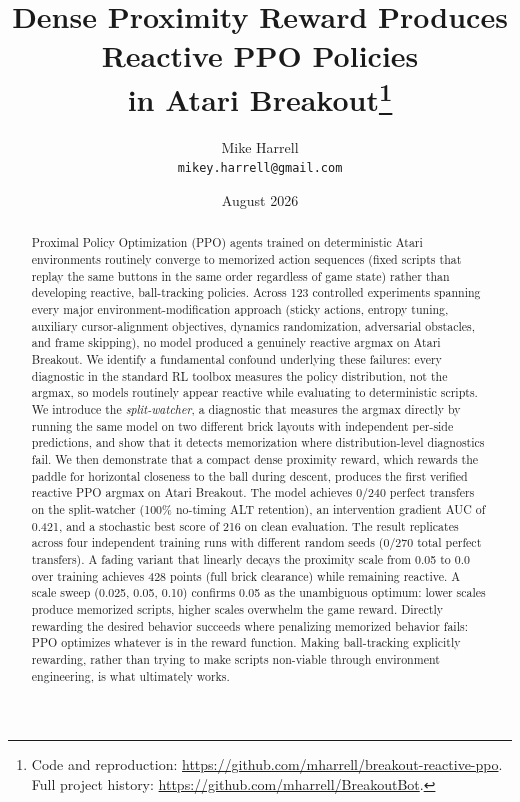 \documentclass[11pt]{article}
\title{\textbf{Dense Proximity Reward Produces Reactive PPO Policies\\
in Atari Breakout}\thanks{Code and reproduction: \url{https://github.com/mharrell/breakout-reactive-ppo}.
Full project history: \url{https://github.com/mharrell/BreakoutBot}.}}
\author{Mike Harrell\\
\texttt{mikey.harrell@gmail.com}}
\date{August 2026}
\begin{document}
\maketitle

\begin{abstract}
Proximal Policy Optimization (PPO) agents trained on deterministic Atari environments
routinely converge to memorized action sequences (fixed scripts that replay the same
buttons in the same order regardless of game state) rather than developing reactive,
ball-tracking policies. Across 123 controlled experiments spanning every major
environment-modification approach (sticky actions, entropy tuning, auxiliary
cursor-alignment objectives, dynamics randomization, adversarial obstacles, and frame
skipping), no model produced a genuinely reactive argmax on Atari Breakout.
We identify a fundamental confound underlying these failures: every diagnostic
in the standard RL toolbox measures the policy distribution, not the
argmax, so models routinely appear reactive while evaluating to deterministic scripts.
We introduce the \emph{split-watcher}, a diagnostic that measures the argmax
directly by running the same model on two different brick layouts with
independent per-side predictions, and show that it detects memorization where
distribution-level diagnostics fail. We then demonstrate that a compact dense
proximity reward, which rewards the paddle for horizontal
closeness to the ball during descent, produces the first verified reactive PPO
argmax on Atari Breakout. The model achieves 0/240 perfect transfers on the
split-watcher (100\% no-timing ALT retention), an intervention gradient AUC of 0.421,
and a stochastic best score of 216 on clean evaluation. The result replicates
across four independent training runs with different random seeds (0/270 total
perfect transfers). A fading variant that linearly decays the proximity scale
from 0.05 to 0.0 over training achieves 428 points (full brick clearance)
while remaining reactive. A scale sweep (0.025, 0.05, 0.10) confirms 0.05 as
the unambiguous optimum: lower scales produce memorized scripts, higher scales
overwhelm the game reward. Directly rewarding the desired behavior succeeds
where penalizing memorized behavior fails: PPO optimizes whatever is in the
reward function. Making ball-tracking explicitly rewarding, rather than trying
to make scripts non-viable through environment engineering, is what ultimately
works.
\end{abstract}

\end{document}
